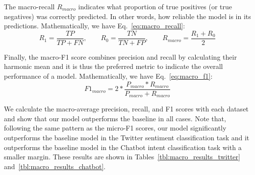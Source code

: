 \documentclass[review]{elsarticle}
\begin{document}
The macro-recall $R_{macro}$ indicates what proportion of true positives (or true negatives) was correctly predicted. In other words, how reliable the model is in its predictions. Mathematically, we have Eq.~\eqref{eq:macro_recall}:
\begin{equation} \label{eq:macro_recall}
R_1 = \frac{TP}{TP + FN}, \qquad R_0 = \frac{TN}{TN + FP}, \qquad R_{macro} = \frac{R_1 + R_0}{2}
\end{equation}

Finally, the macro-F1 score combines precision and recall by calculating their harmonic mean and it is thus the preferred metric to indicate the overall performance of a model. Mathematically, we have Eq.~\eqref{eq:macro_f1}:
\begin{equation} \label{eq:macro_f1}
F1_{macro} = 2 * \frac{P_{macro} * R_{macro}}{P_{macro} + R_{macro}} 
\end{equation}

We calculate the macro-average precision, recall, and F1 scores with each dataset and show that our model outperforms the baseline in all cases. Note that, following the same pattern as the micro-F1 scores, our model significantly outperforms the baseline model in the Twitter sentiment classification task and it outperforms the baseline model in the Chatbot intent classification task with a smaller margin. These results are shown in Tables~\ref{tbl:macro_results_twitter} and~\ref{tbl:macro_results_chatbot}.

\begin{table}[ht!]
    \centering
    \caption{Macro-average precision (P), recall (R), and F1 scores (\%) for the Twitter Sentiment Classification Corpus. Note that: (\textit{Inc}) is the original dataset, with naturally incorrect tweets, (\textit{Corr}) is the corrected version of the dataset and (\textit{Inc+Corr}) contains both.}
    \label{tbl:macro_results_twitter}
\end{table}
\end{document}
